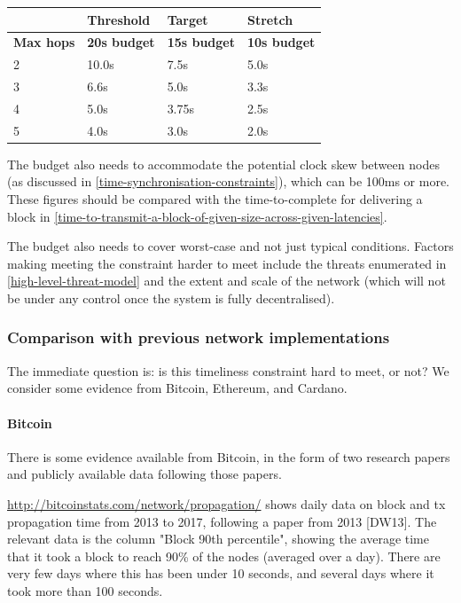 \documentclass[11pt,a4paper]{article}
\begin{document}
\begin{longtable}[]{@{}llll@{}}
\toprule
& Threshold & Target & Stretch\tabularnewline
\midrule
\endhead
\textbf{Max hops} & \textbf{20s budget} & \textbf{15s budget} &
\textbf{10s budget}\tabularnewline
2 & 10.0s & 7.5s & 5.0s\tabularnewline
3 & 6.6s & 5.0s & 3.3s\tabularnewline
4 & 5.0s & 3.75s & 2.5s\tabularnewline
5 & 4.0s & 3.0s & 2.0s\tabularnewline
\bottomrule
\end{longtable}

The budget also needs to accommodate the potential clock skew between
nodes (as discussed in \cref{time-synchronisation-constraints}),
which can be 100ms or more. These figures should
be compared with the time-to-complete for delivering a block in
\cref{time-to-transmit-a-block-of-given-size-across-given-latencies}.

The budget also needs to cover worst-case and not just typical
conditions. Factors making meeting the constraint harder to meet include
the threats enumerated in
\cref{high-level-threat-model} and the extent and
scale of the network (which will not be under any control once the
system is fully decentralised).

\subsubsection{Comparison with previous network implementations}
\label{comparison-with-previous-network-implementations}

The immediate question is: is this timeliness constraint hard to meet,
or not? We consider some evidence from Bitcoin, Ethereum, and Cardano.

\paragraph{Bitcoin}
\label{bitcoin}

There is some evidence available from Bitcoin, in the form of two
research papers and publicly available data following those papers.

\href{http://bitcoinstats.com/network/propagation/}{{http://bitcoinstats.com/network/propagation/}}
shows daily data on block and tx propagation time from 2013 to 2017,
following a paper from 2013 {[}DW13{]}. The relevant data is the column
"Block 90th percentile", showing the average time that it took a block
to reach 90\% of the nodes (averaged over a day). There are very few
days where this has been under 10 seconds, and several days where it
took more than 100 seconds.
\end{document}
